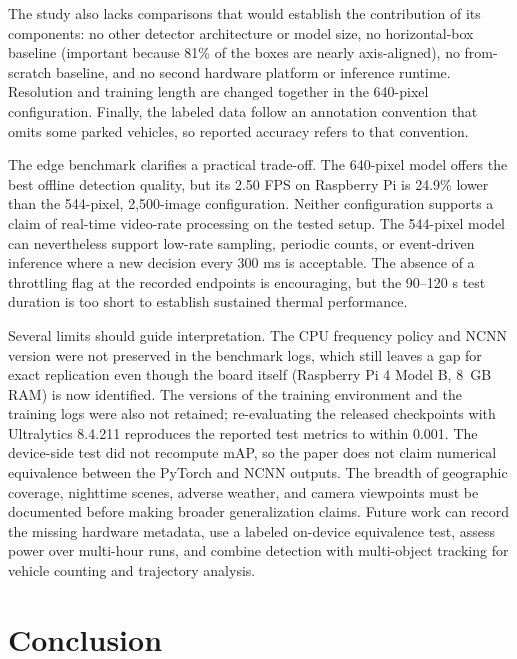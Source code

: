 \documentclass[runningheads]{llncs}
\begin{document}
The study also lacks comparisons that would establish the contribution of its
components: no other detector architecture or model size, no horizontal-box
baseline (important because 81\% of the boxes are nearly axis-aligned), no
from-scratch baseline, and no second hardware platform or inference runtime.
Resolution and training length are changed together in the 640-pixel
configuration. Finally, the labeled data follow an annotation convention that
omits some parked vehicles, so reported accuracy refers to that convention.

The edge benchmark clarifies a practical trade-off. The 640-pixel model offers
the best offline detection quality, but its 2.50 FPS on Raspberry Pi is 24.9\%
lower than the 544-pixel, 2,500-image configuration. Neither configuration
supports a claim of real-time video-rate processing on the tested setup. The
544-pixel model can nevertheless support low-rate sampling, periodic counts, or
event-driven inference where a new decision every 300 ms is acceptable. The
absence of a throttling flag at the recorded endpoints is encouraging, but the
90--120 s test duration is too short to establish sustained thermal performance.

Several limits should guide interpretation. The CPU frequency policy and
NCNN version were not preserved in the benchmark logs, which still leaves a
gap for exact replication even though the board itself (Raspberry Pi 4 Model
B, 8~GB RAM) is now identified. The versions of the training environment and
the training logs were also not retained; re-evaluating the released
checkpoints with Ultralytics 8.4.211 reproduces the reported test metrics to
within 0.001. The device-side test did not recompute mAP, so the paper does not
claim numerical equivalence between the PyTorch and NCNN outputs. The breadth of
geographic coverage, nighttime scenes, adverse weather, and camera viewpoints
must be documented before making broader generalization claims. Future work can
record the missing hardware metadata, use a labeled on-device equivalence test,
assess power over multi-hour runs, and combine detection with multi-object
tracking for vehicle counting and trajectory analysis.

\section{Conclusion}
\end{document}
